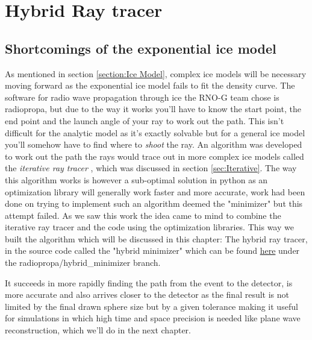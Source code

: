 \chapter{Hybrid Ray tracer}
\label{chapter:hybrid}
\section{Shortcomings of the exponential ice model}
As mentioned in section \ref{section:Ice Model}, complex ice models will be
necessary moving forward as the exponential ice model fails to fit the density
curve.  The software for radio wave propagation through ice the RNO-G team
chose is radiopropa\cite{Winchen_2019}, but due to the way it works you'll have
to know the start point, the end point and the launch angle of your ray to work
out the path. This isn't difficult for the analytic model as it's exactly
solvable but for a general ice model you'll somehow have to find where to
\textit{shoot} the ray. An algorithm was developed to work out the path the
rays would trace out in more complex ice models called the \textit{iterative
ray tracer} \cite{2022icrc.confE1027O}, which was discussed in section
\ref{sec:Iterative}. The way this algorithm works is however a sub-optimal
solution in python as an optimization library will generally work faster and
more accurate, work had been done on trying to implement such an algorithm
deemed the "minimizer" but this attempt failed.  As we saw this work the idea
came to mind to combine the iterative ray tracer and the code using the
optimization libraries. This way we built the algorithm which will be discussed in
this chapter: The hybrid ray tracer, in the source code called the "hybrid
minimizer" which can be found
\href{https://github.com/arthuradriaens-code/NuRadioMC.git}{here} under the
radiopropa/hybrid\_minimizer branch.

It succeeds in more rapidly finding the path from the event to the detector, is
more accurate and also arrives closer to the detector as the final result is
not limited by the final drawn sphere size but by a given tolerance making it
useful for simulations in which high time and space precision is needed like
plane wave reconstruction, which we'll do in the next chapter.

